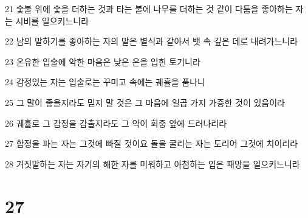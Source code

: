 \par 21 숯불 위에 숯을 더하는 것과 타는 불에 나무를 더하는 것 같이 다툼을 좋아하는 자는 시비를 일으키느니라
\par 22 남의 말하기를 좋아하는 자의 말은 별식과 같아서 뱃 속 깊은 데로 내려가느니라
\par 23 온유한 입술에 악한 마음은 낮은 은을 입힌 토기니라
\par 24 감정있는 자는 입술로는 꾸미고 속에는 궤휼을 품나니
\par 25 그 말이 좋을지라도 믿지 말 것은 그 마음에 일곱 가지 가증한 것이 있음이라
\par 26 궤휼로 그 감정을 감출지라도 그 악이 회중 앞에 드러나리라
\par 27 함정을 파는 자는 그것에 빠질 것이요 돌을 굴리는 자는 도리어 그것에 치이리라
\par 28 거짓말하는 자는 자기의 해한 자를 미워하고 아첨하는 입은 패망을 일으키느니라

\chapter{27}

